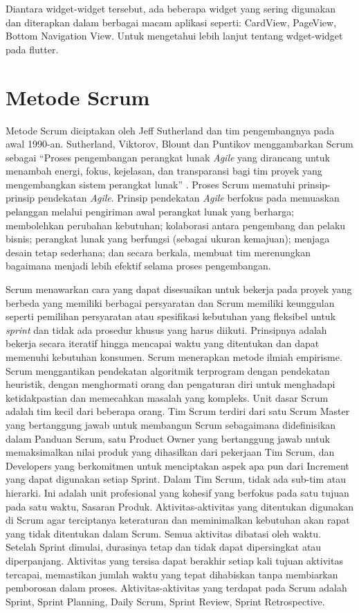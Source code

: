 Diantara widget-widget tersebut, ada beberapa widget yang sering digunakan dan diterapkan dalam berbagai macam aplikasi seperti: CardView, PageView, Bottom Navigation View. Untuk mengetahui lebih lanjut tentang wdget-widget pada flutter.

\section{Metode Scrum}
Metode Scrum diciptakan oleh Jeff Sutherland dan tim pengembangnya pada awal 1990-an. Sutherland, Viktorov, Blount dan Puntikov menggambarkan Scrum sebagai “Proses pengembangan perangkat lunak \textit{Agile} yang dirancang untuk menambah energi, fokus, kejelasan, dan transparansi bagi tim proyek yang mengembangkan sistem perangkat lunak” \citep{sutherland2007}. Proses Scrum mematuhi prinsip-prinsip pendekatan \textit{Agile}. Prinsip pendekatan \textit{Agile} berfokus pada memuaskan pelanggan melalui pengiriman awal perangkat lunak yang berharga; membolehkan perubahan kebutuhan; kolaborasi antara pengembang dan pelaku bisnis; perangkat lunak yang berfungsi (sebagai ukuran kemajuan); menjaga desain tetap sederhana; dan secara berkala, membuat tim merenungkan bagaimana menjadi lebih efektif selama proses pengembangan.

Scrum menawarkan cara yang dapat disesuaikan untuk bekerja pada proyek yang berbeda yang memiliki berbagai persyaratan dan Scrum memiliki keunggulan seperti pemilihan persyaratan atau spesifikasi kebutuhan yang fleksibel untuk \textit{sprint} dan tidak ada prosedur khusus yang harus diikuti. Prinsipnya adalah bekerja secara iteratif hingga mencapai waktu yang ditentukan dan dapat memenuhi kebutuhan konsumen. Scrum menerapkan metode ilmiah empirisme. Scrum 
menggantikan pendekatan algoritmik terprogram dengan pendekatan heuristik, dengan menghormati orang dan pengaturan diri untuk menghadapi ketidakpastian dan memecahkan masalah yang kompleks. Unit dasar Scrum adalah tim kecil dari beberapa orang. Tim Scrum terdiri dari satu Scrum Master yang bertanggung jawab untuk membangun Scrum sebagaimana didefinisikan dalam Panduan Scrum, satu Product Owner yang bertanggung jawab untuk memaksimalkan nilai produk yang dihasilkan dari pekerjaan Tim Scrum, dan Developers yang berkomitmen untuk menciptakan aspek apa pun dari Increment yang dapat digunakan setiap Sprint. Dalam Tim Scrum, tidak ada sub-tim atau hierarki. Ini adalah unit profesional yang kohesif yang berfokus pada satu tujuan pada satu waktu, Sasaran Produk. Aktivitas-aktivitas yang ditentukan digunakan di Scrum agar terciptanya keteraturan dan meminimalkan kebutuhan akan rapat yang tidak ditentukan dalam Scrum. Semua aktivitas dibatasi oleh waktu. Setelah Sprint dimulai, durasinya tetap dan tidak dapat dipersingkat atau diperpanjang. Aktivitas yang tersisa dapat berakhir setiap kali tujuan aktivitas tercapai, memastikan jumlah waktu yang tepat dihabiskan tanpa membiarkan pemborosan dalam proses. Aktivitas-aktivitas yang terdapat pada Scrum adalah Sprint, Sprint Planning, Daily Scrum, Sprint Review, Sprint Retrospective.

